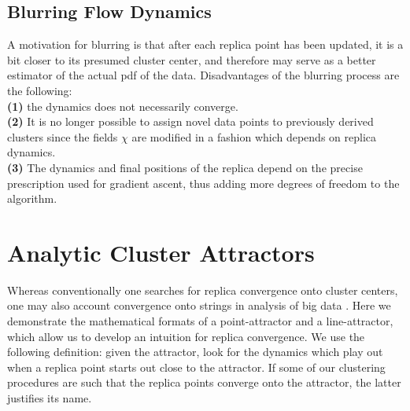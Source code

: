 \documentclass[preprint,12pt]{elsarticle}
\begin{document}
\subsection{Blurring Flow Dynamics}
\label{blurring}
 A motivation for blurring is that after each replica point has been updated, it is a bit closer to its presumed cluster center, and therefore may serve as a better estimator of the actual pdf of the data. Disadvantages of the blurring process are the following:\\ 
\textbf{(1)} the dynamics does not necessarily converge.  \\
\textbf{(2)} It is no longer possible to assign novel data points to previously derived clusters since the fields $\chi$ are modified in a fashion which depends on replica dynamics. \\
\textbf{(3)} The dynamics and final positions of the replica depend on the precise prescription used for gradient ascent, thus adding more degrees of freedom to the algorithm.


























\section{Analytic Cluster Attractors}
\label{analytic}
Whereas conventionally one searches for replica convergence onto cluster centers, one may also account convergence onto strings in analysis of big data \cite{weinstein2013}. Here we demonstrate the mathematical formats of a point-attractor and a line-attractor, which allow us to develop an intuition for replica convergence. We use the following definition: given the attractor, look for the dynamics which play out when a replica point starts out close to the attractor. If some of our clustering procedures are such that the replica points converge onto the attractor, the latter justifies its name.
\end{document}
